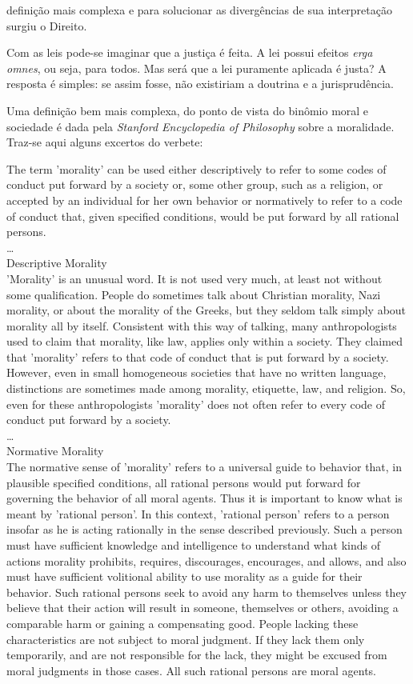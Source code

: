 \documentclass[
	12pt,				%
	openright,			%
	twoside,			%
	a4paper,			%
	chapter=TITLE,		%
	section=TITLE,		%
	subsection=TITLE,	%
	subsubsection=TITLE,%
	spanish,            %
	english,			%
	brazil				%
	]{abntex2}
\begin{document}
definição mais complexa e para solucionar as divergências de sua interpretação surgiu o Direito.
\par
Com as leis pode-se imaginar que a justiça é feita. A lei possui efeitos \textit{erga omnes}, ou seja,
para todos. Mas será que a lei puramente aplicada é justa? A resposta é simples: se assim fosse, não existiriam a doutrina e a jurisprudência.
\par
Uma definição bem mais complexa, do ponto de vista do binômio moral e sociedade é dada pela \textit{Stanford Encyclopedia of Philosophy}
sobre a moralidade. Traz-se aqui alguns excertos do verbete:
\begin{citacao}[english]
	The term 'morality' can be used either
	descriptively to refer to some codes of conduct put forward by a society or, some other group, such as a religion, or
	accepted by an individual for her own behavior or 
	normatively to refer to a code of conduct that, given specified conditions, would be put forward by all rational persons.\\
	\ldots\\
	Descriptive Morality\\
	'Morality' is an unusual word. It is not used very much, at least not without some qualification. People do sometimes talk about Christian morality, Nazi morality, or about the morality of the Greeks, but they seldom talk simply about morality all by itself. Consistent with this way of talking, many anthropologists used to claim that morality, like law, applies only within a society. They claimed that 'morality' refers to that code of conduct that is put forward by a society. However, even in small homogeneous societies that have no written language, distinctions are sometimes made among morality, etiquette, law, and religion. So, even for these anthropologists 'morality' does not often refer to every code of conduct put forward by a society. \\
	\ldots\\
	Normative Morality\\
	The normative sense of 'morality' refers to a universal guide to behavior that, in plausible specified conditions, all rational persons would put forward for governing the behavior of all moral agents. Thus it is important to know what is meant by 'rational person'. In this context, 'rational person' refers to a person insofar as he is acting rationally in the sense described previously. Such a person must have sufficient knowledge and intelligence to understand what kinds of actions morality prohibits, requires, discourages, encourages, and allows, and also must have sufficient volitional ability to use morality as a guide for their behavior. Such rational persons seek to avoid any harm to themselves unless they believe that their action will result in someone, themselves or others, avoiding a comparable harm or gaining a compensating good. People lacking these characteristics are not subject to moral judgment. If they lack them only temporarily, and are not responsible for the lack, they might be excused from moral judgments in those cases. All such rational persons are moral agents.\cite{sep-morality-definition}
	\end{citacao}
\end{document}
